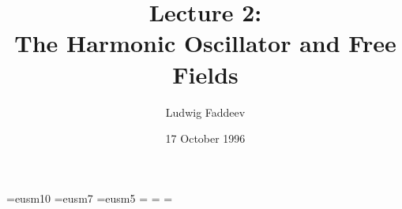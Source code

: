 
\font\teneusm=eusm10  \font\seveneusm=eusm7 
\font\fiveeusm=eusm5 
\newfam\eusmfam 
\textfont\eusmfam=\teneusm 
\scriptfont\eusmfam=\seveneusm 
\scriptscriptfont\eusmfam=\fiveeusm 
\def\Scr#1{{\fam\eusmfam\relax#1}}

\newcommand{\ScrA}{{\Scr A}} \newcommand{\ScrB}{{\Scr B}}
\newcommand{\ScrC}{{\Scr C}} \newcommand{\ScrD}{{\Scr D}}
\newcommand{\ScrE}{{\Scr E}} \newcommand{\ScrF}{{\Scr F}}
\newcommand{\ScrG}{{\Scr G}} \newcommand{\ScrH}{{\Scr H}}
\newcommand{\ScrI}{{\Scr I}} \newcommand{\ScrJ}{{\Scr J}}
\newcommand{\ScrK}{{\Scr K}} \newcommand{\ScrL}{{\Scr L}}
\newcommand{\ScrM}{{\Scr M}} \newcommand{\ScrN}{{\Scr N}}
\newcommand{\ScrO}{{\Scr O}} \newcommand{\ScrP}{{\Scr P}}
\newcommand{\ScrQ}{{\Scr Q}} \newcommand{\ScrR}{{\Scr R}}
\newcommand{\ScrS}{{\Scr S}} \newcommand{\ScrT}{{\Scr T}}
\newcommand{\ScrU}{{\Scr U}} \newcommand{\ScrV}{{\Scr V}}
\newcommand{\ScrW}{{\Scr W}} \newcommand{\ScrX}{{\Scr X}}
\newcommand{\ScrY}{{\Scr Y}} \newcommand{\ScrZ}{{\Scr Z}}


\newcommand{\grA}{{\frak A}}



\def\eps{\varepsilon}

\setlength{\textwidth}{6.5in}
\setlength{\textheight}{9.1in}
\setlength{\evensidemargin}{0in}
\setlength{\oddsidemargin}{0in}
\setlength{\topmargin}{-.75in}
\setlength{\parskip}{0.3\baselineskip}


\newcommand{\Le}{{{\mathchoice{\,{\scriptstyle\le}\,}
  {\,{\scriptstyle\le}\,}
  {\,{\scriptscriptstyle\le}\,}{\,{\scriptscriptstyle\le}\,}}}}
\newcommand{\Ge}{{{\mathchoice{\,{\scriptstyle\ge}\,}
  {\,{\scriptstyle\ge}\,}
  {\,{\scriptscriptstyle\ge}\,}{\,{\scriptscriptstyle\ge}\,}}}}




\nc{\bra}{  < }
\nc{\ket}{ > }
\nc{\triang}{ { \bigtriangleup} }

\nc{\hatastar}{{ \hat{\astar} }}



\title{Lecture 2:\\
 The Harmonic Oscillator and Free Fields}
\author{Ludwig Faddeev}
\date{17  October 1996}

